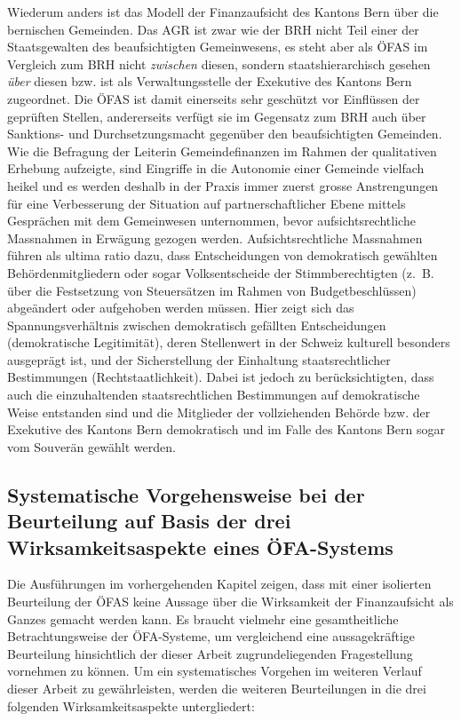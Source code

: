 \documentclass[10pt]{article}
\begin{document}
Wiederum anders ist das Modell der Finanzaufsicht des Kantons Bern über die bernischen Gemeinden. Das AGR ist zwar wie der BRH nicht Teil einer der Staatsgewalten des beaufsichtigten Gemeinwesens, es steht aber als ÖFAS im Vergleich zum BRH nicht \textit{zwischen} diesen, sondern staatshierarchisch gesehen \textit{über} diesen bzw. ist als Verwaltungsstelle der Exekutive des Kantons Bern zugeordnet. Die ÖFAS ist damit einerseits sehr geschützt vor Einflüssen der geprüften Stellen, andererseits verfügt sie im Gegensatz zum BRH auch über Sanktions- und Durchsetzungsmacht gegenüber den beaufsichtigten Gemeinden. Wie die Befragung der Leiterin Gemeindefinanzen im Rahmen der qualitativen Erhebung aufzeigte, sind Eingriffe in die Autonomie einer Gemeinde vielfach heikel und es werden deshalb in der Praxis immer zuerst grosse Anstrengungen für eine Verbesserung der Situation auf partnerschaftlicher Ebene mittels Gesprächen mit dem Gemeinwesen unternommen, bevor aufsichtsrechtliche Massnahmen in Erwägung gezogen werden. Aufsichtsrechtliche Massnahmen führen als ultima ratio dazu, dass Entscheidungen von demokratisch gewählten Behördenmitgliedern oder sogar Volksentscheide der Stimmberechtigten (z.~B. über die Festsetzung von Steuersätzen im Rahmen von Budgetbeschlüssen) abgeändert oder aufgehoben werden müssen. Hier zeigt sich das Spannungsverhältnis zwischen demokratisch gefällten Entscheidungen (demokratische Legitimität), deren Stellenwert in der Schweiz kulturell besonders ausgeprägt ist, und der Sicherstellung der Einhaltung staatsrechtlicher Bestimmungen (Rechtstaatlichkeit). Dabei ist jedoch zu berücksichtigten, dass auch die einzuhaltenden staatsrechtlichen Bestimmungen auf demokratische Weise entstanden sind und die Mitglieder der vollziehenden Behörde bzw. der Exekutive des Kantons Bern demokratisch und im Falle des Kantons Bern sogar vom Souverän gewählt werden.

\subsection{Systematische Vorgehensweise bei der Beurteilung auf Basis der drei Wirksamkeitsaspekte eines ÖFA-Systems}\label{subsec:systematische_vorgehensweise_bei_der_beurteilung_auf_basis_der_drei_wirksamkeitsaspekte_eines_ofa_systems}
Die Ausführungen im vorhergehenden Kapitel zeigen, dass mit einer isolierten Beurteilung der ÖFAS keine Aussage über die Wirksamkeit der Finanzaufsicht als Ganzes gemacht werden kann. Es braucht vielmehr eine gesamtheitliche Betrachtungsweise der ÖFA-Systeme, um vergleichend eine aussagekräftige Beurteilung hinsichtlich der dieser Arbeit zugrundeliegenden Fragestellung vornehmen zu können. Um ein systematisches Vorgehen im weiteren Verlauf dieser Arbeit zu gewährleisten, werden die weiteren Beurteilungen in die drei folgenden Wirksamkeitsaspekte untergliedert:
\end{document}
